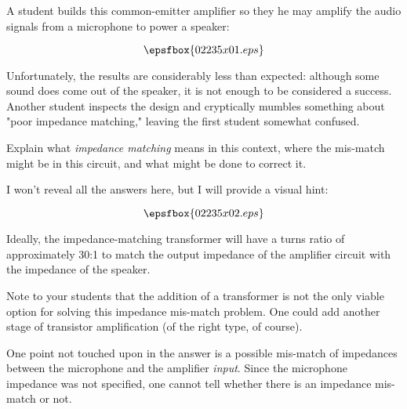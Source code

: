

A student builds this common-emitter amplifier so they he may amplify the audio signals from a microphone to power a speaker:

$$\epsfbox{02235x01.eps}$$

Unfortunately, the results are considerably less than expected: although some sound does come out of the speaker, it is not enough to be considered a success.  Another student inspects the design and cryptically mumbles something about "poor impedance matching," leaving the first student somewhat confused.

Explain what {\it impedance matching} means in this context, where the mis-match might be in this circuit, and what might be done to correct it.







I won't reveal all the answers here, but I will provide a visual hint:

$$\epsfbox{02235x02.eps}$$

Ideally, the impedance-matching transformer will have a turns ratio of approximately 30:1 to match the output impedance of the amplifier circuit with the impedance of the speaker.







Note to your students that the addition of a transformer is not the only viable option for solving this impedance mis-match problem.  One could add another stage of transistor amplification (of the right type, of course).

One point not touched upon in the answer is a possible mis-match of impedances between the microphone and the amplifier {\it input}.  Since the microphone impedance was not specified, one cannot tell whether there is an impedance mis-match or not.




